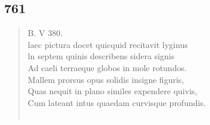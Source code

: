 \documentclass[11pt, a4paper]{report}
\begin{document}
            \subsection*{761}
      \begin{verse}
      B. V 380. \\ laec pictura docet quicquid recitavit lyginus \\ ln septem quinis describens sidera signis \\ Ad caeli terraeque globos in mole rotundos. \\ Mallem prorsus opus solidis insigne figuris, \\ Quas nequit in plano similes expendere quivis, \\ Cum lateant intus quaedam curvisque profundis. \\ 
        ﻿\pagebreak 

\end{verse}
\end{document}
